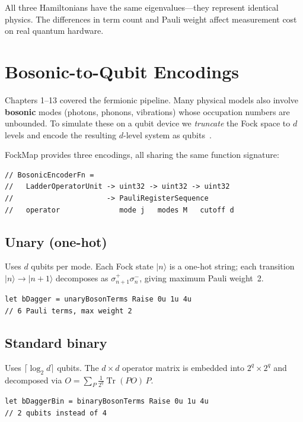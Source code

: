 \documentclass[10pt,a4paper]{article}
\begin{document}
All three Hamiltonians have the same eigenvalues---they represent
identical physics.  The differences in term count and Pauli weight
affect measurement cost on real quantum hardware.


\section{Bosonic-to-Qubit Encodings}\label{ch:bosonic}

Chapters 1--13 covered the fermionic pipeline.  Many physical models
also involve \textbf{bosonic} modes (photons, phonons, vibrations) whose
occupation numbers are unbounded.  To simulate these on a qubit device
we \emph{truncate} the Fock space to $d$ levels and encode the resulting
$d$-level system as qubits~\cite{sawaya2020}.

FockMap provides three encodings, all sharing the same function
signature:

\begin{lstlisting}
// BosonicEncoderFn =
//   LadderOperatorUnit -> uint32 -> uint32 -> uint32
//                      -> PauliRegisterSequence
//   operator              mode j   modes M   cutoff d
\end{lstlisting}

\subsection{Unary (one-hot)}

Uses $d$ qubits per mode.  Each Fock state $|n\rangle$ is a one-hot
string; each transition $|n\rangle \to |n{+}1\rangle$ decomposes as
$\sigma^+_{n+1}\sigma^-_n$, giving maximum Pauli weight~2.

\begin{lstlisting}
let bDagger = unaryBosonTerms Raise 0u 1u 4u
// 6 Pauli terms, max weight 2
\end{lstlisting}

\subsection{Standard binary}

Uses $\lceil\log_2 d\rceil$ qubits.  The $d\times d$ operator matrix is
embedded into $2^q\times 2^q$ and decomposed via $O = \sum_P
\tfrac{1}{2^q}\operatorname{Tr}(PO)\,P$.

\begin{lstlisting}
let bDaggerBin = binaryBosonTerms Raise 0u 1u 4u
// 2 qubits instead of 4
\end{lstlisting}
\end{document}
